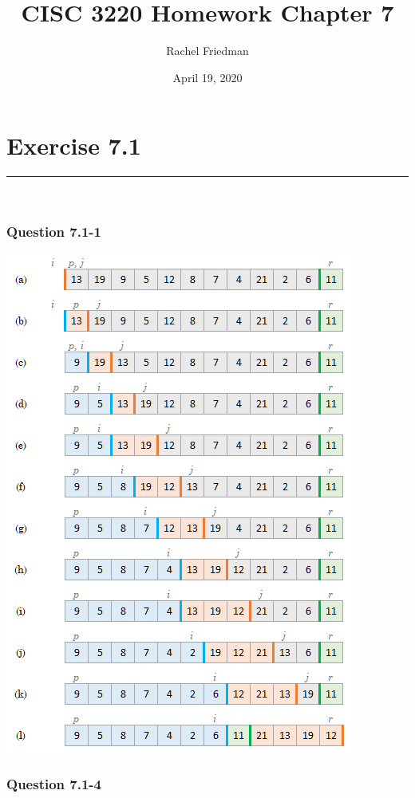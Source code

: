 \documentclass[11pt]{article}
\title{CISC 3220 Homework Chapter 7}
\author{Rachel Friedman}
\date{April 19, 2020}
\begin{document}
\maketitle

\section*{Exercise 7.1}\nointerlineskip
\noindent \rule{\linewidth}{0.01pt}\\

\subsubsection*{Question 7.1-1}\nointerlineskip

\includegraphics[scale=.9]{Ques_7-1-1.png}\\

\subsubsection*{Question 7.1-4}\nointerlineskip
\end{document}
